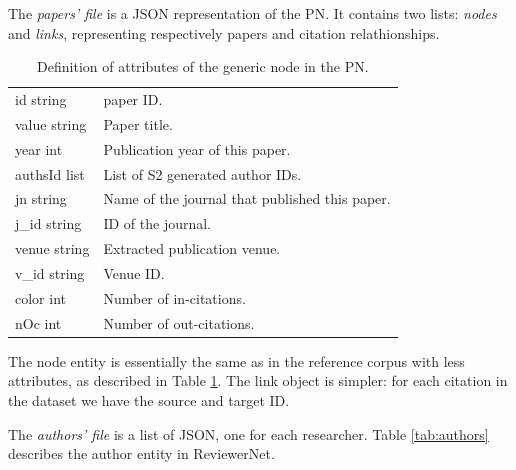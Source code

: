 The \emph{papers' file} is a JSON representation of the PN. It contains two lists: \textit{nodes} and \textit{links}, representing respectively papers and citation relathionships. 
\begin{table}[!ht]
    \centering
    \begin{tabular}{ll}
    id {\color[HTML]{656565}string}    & paper ID.           \\ 
    value {\color[HTML]{656565}string} & Paper title.                      \\
    year {\color[HTML]{656565}int}     & Publication year of this paper.   \\
    authsId {\color[HTML]{656565}list} & List of S2 generated author IDs.  \\                
    jn {\color[HTML]{656565}string}                                          & Name of the journal that published this paper. \\
    j\_id {\color[HTML]{656565}string}                                        & ID of the journal.                             \\
    venue {\color[HTML]{656565}string}                                       & Extracted publication venue.                   \\
    v\_id {\color[HTML]{656565}string}                                        & Venue ID.                                      \\
    color {\color[HTML]{656565}int}    & Number of in-citations.            \\  
    nOc {\color[HTML]{656565}int} & Number of out-citations. 
\end{tabular}
    \caption{Definition of attributes of the generic node in the PN. \label{tab:nodes}}
   
    \end{table}

    The node entity is essentially the same as in the reference corpus with less attributes, as described in Table \ref{tab:nodes}. The link object is simpler: for each citation in the dataset we have the source and target ID. 
    
    The \emph{authors' file} is a list of JSON, one for each researcher. Table \ref{tab:authors} describes the author entity in ReviewerNet.

